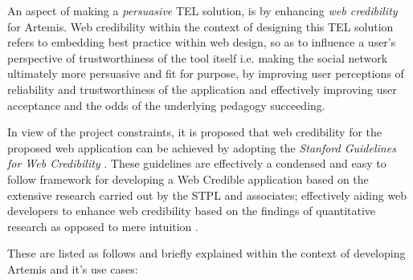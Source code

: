 An aspect of making a \textit{persuasive} TEL solution, is by enhancing \textit{web credibility} for Artemis. Web credibility within the context of designing this TEL solution refers to embedding best practice within web design, so as to influence a user's perspective of trustworthiness of the tool itself \cite{Fogg2001,Fogg2002} i.e. making the social network ultimately more persuasive and fit for purpose, by improving user perceptions of reliability and trustworthiness of the application \cite{Fogg2001} and effectively improving user acceptance and the odds of the underlying pedagogy succeeding.


In view of the project constraints, it is proposed that web credibility for the proposed web application can be achieved by adopting  the \textit{Stanford Guidelines for Web Credibility} \cite{Fogg2002a}. These guidelines are effectively a condensed and easy to follow framework for developing a Web Credible application based on the extensive research carried out by the STPL and associates; effectively aiding web developers to enhance web credibility based on the findings of quantitative research as opposed to mere intuition \cite{Fogg2002a,Fogg2002,Fogg1999}.

\newpage
These are listed as follows and briefly explained within the context of developing Artemis  and it's use cases:

